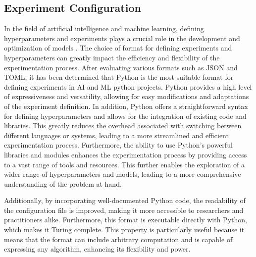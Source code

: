 \subsection{Experiment Configuration}

In the field of artificial intelligence and machine learning, defining hyperparameters and experiments plays a crucial role in the development and optimization of models \cite{wu2019hyperparameter}. The choice of format for defining experiments and hyperparameters can greatly impact the efficiency and flexibility of the experimentation process. After evaluating various formats such as JSON and TOML, it has been determined that Python is the most suitable format for defining experiments in AI and ML python projects. Python provides a high level of expressiveness and versatility, allowing for easy modifications and adaptations of the experiment definition. In addition, Python offers a straightforward syntax for defining hyperparameters and allows for the integration of existing code and libraries. This greatly reduces the overhead associated with switching between different languages or systems, leading to a more streamlined and efficient experimentation process. Furthermore, the ability to use Python's powerful libraries and modules enhances the experimentation process by providing access to a vast range of tools and resources. This further enables the exploration of a wider range of hyperparameters and models, leading to a more comprehensive understanding of the problem at hand.

Additionally, by incorporating well-documented Python code, the readability of the configuration file is improved, making it more accessible to researchers and practitioners alike. Furthermore, this format is executable directly with Python, which makes it Turing complete. This property is particularly useful because it means that the format can include arbitrary computation and is capable of expressing any algorithm, enhancing its flexibility and power.




